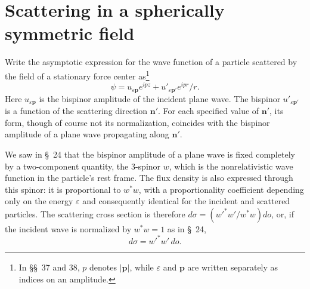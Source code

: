 \section{Scattering in a spherically symmetric field}

Write the asymptotic expression for the wave function of a particle scattered by the field of a stationary force center as\footnote{In \S\S~37 and 38, $p$ denotes $|\mathbf p|$, while $\varepsilon$ and $\mathbf p$ are written separately as indices on an amplitude.}
\begin{equation}
\psi=u_{\varepsilon\mathbf p}e^{ipz}+u'_{\varepsilon\mathbf p'}e^{ipr}/r.
\tag{37.1}
\end{equation}
Here $u_{\varepsilon\mathbf p}$ is the bispinor amplitude of the incident plane wave. The bispinor $u'_{\varepsilon\mathbf p'}$ is a function of the scattering direction $\mathbf n'$. For each specified value of $\mathbf n'$, its form, though of course not its normalization, coincides with the bispinor amplitude of a plane wave propagating along $\mathbf n'$.

We saw in \S~24 that the bispinor amplitude of a plane wave is fixed completely by a two-component quantity, the 3-spinor $w$, which is the nonrelativistic wave function in the particle's rest frame. The flux density is also expressed through this spinor: it is proportional to $w^*w$, with a proportionality coefficient depending only on the energy $\varepsilon$ and consequently identical for the incident and scattered particles. The scattering cross section is therefore $d\sigma=(w'^*w'/w^*w)do$, or, if the incident wave is normalized by $w^*w=1$ as in \S~24,
\[
d\sigma=w'^*w'\,do.
\]


